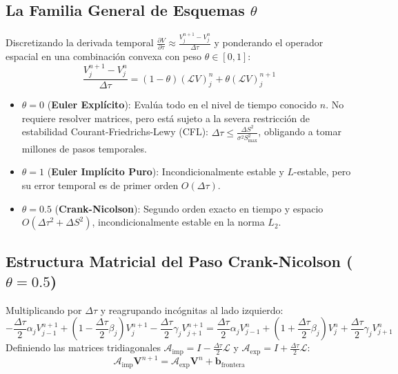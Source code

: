 \documentclass[11pt,a4paper]{article}
\begin{document}
\subsection{La Familia General de Esquemas $\theta$}
Discretizando la derivada temporal $\frac{\partial V}{\partial \tau} \approx \frac{V_j^{n+1} - V_j^n}{\Delta \tau}$ y ponderando el operador espacial en una combinación convexa con peso $\theta \in [0, 1]$:
\begin{equation}
    \frac{V_j^{n+1} - V_j^n}{\Delta \tau} = (1 - \theta) (\mathcal{L} V)_j^n + \theta (\mathcal{L} V)_j^{n+1}
\end{equation}
\begin{itemize}
    \item $\theta = 0$ (\textbf{Euler Explícito}): Evalúa todo en el nivel de tiempo conocido $n$. No requiere resolver matrices, pero está sujeto a la severa restricción de estabilidad Courant-Friedrichs-Lewy (CFL): $\Delta \tau \le \frac{\Delta S^2}{\sigma^2 S_{\max}^2}$, obligando a tomar millones de pasos temporales.
    \item $\theta = 1$ (\textbf{Euler Implícito Puro}): Incondicionalmente estable y $L$-estable, pero su error temporal es de primer orden $O(\Delta \tau)$.
    \item $\theta = 0.5$ (\textbf{Crank-Nicolson}): Segundo orden exacto en tiempo y espacio $O(\Delta \tau^2 + \Delta S^2)$, incondicionalmente estable en la norma $L_2$.
\end{itemize}

\subsection{Estructura Matricial del Paso Crank-Nicolson ($\theta = 0.5$)}
Multiplicando por $\Delta \tau$ y reagrupando incógnitas al lado izquierdo:
\begin{equation}
    \label{eq:cn_system}
    -\frac{\Delta \tau}{2} \alpha_j V_{j-1}^{n+1} + \left( 1 - \frac{\Delta \tau}{2} \beta_j \right) V_j^{n+1} - \frac{\Delta \tau}{2} \gamma_j V_{j+1}^{n+1} = \frac{\Delta \tau}{2} \alpha_j V_{j-1}^n + \left( 1 + \frac{\Delta \tau}{2} \beta_j \right) V_j^n + \frac{\Delta \tau}{2} \gamma_j V_{j+1}^n
\end{equation}
Definiendo las matrices tridiagonales $\mathcal{A}_{\text{imp}} = I - \frac{\Delta \tau}{2} \mathcal{L}$ y $\mathcal{A}_{\text{exp}} = I + \frac{\Delta \tau}{2} \mathcal{L}$:
\begin{equation}
    \mathcal{A}_{\text{imp}} \mathbf{V}^{n+1} = \mathcal{A}_{\text{exp}} \mathbf{V}^n + \mathbf{b}_{\text{frontera}}
\end{equation}
\end{document}
